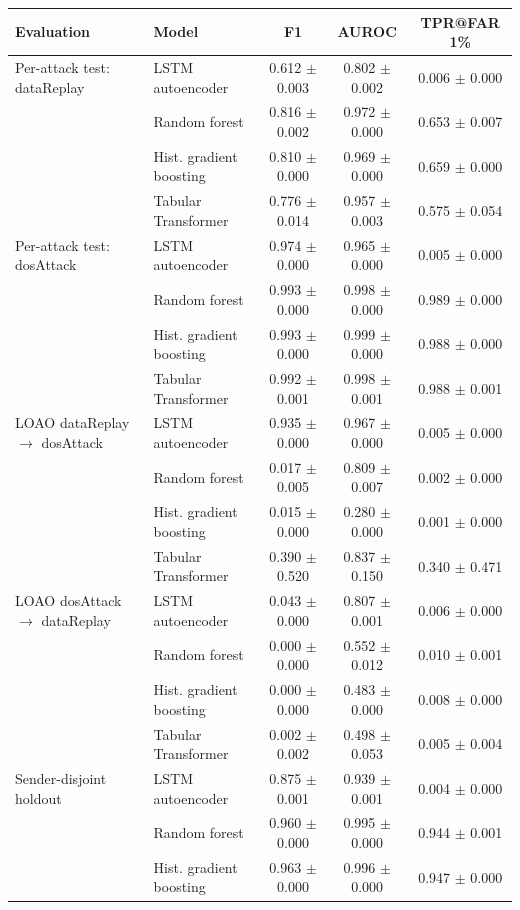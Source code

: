 \begin{tabular}{llccc}
\toprule
Evaluation & Model & F1 & AUROC & TPR@FAR 1\% \\
\midrule
Per-attack test: dataReplay & LSTM autoencoder & 0.612 $\pm$ 0.003 & 0.802 $\pm$ 0.002 & 0.006 $\pm$ 0.000 \\
 & Random forest & 0.816 $\pm$ 0.002 & 0.972 $\pm$ 0.000 & 0.653 $\pm$ 0.007 \\
 & Hist. gradient boosting & 0.810 $\pm$ 0.000 & 0.969 $\pm$ 0.000 & 0.659 $\pm$ 0.000 \\
 & Tabular Transformer & 0.776 $\pm$ 0.014 & 0.957 $\pm$ 0.003 & 0.575 $\pm$ 0.054 \\
\midrule
Per-attack test: dosAttack & LSTM autoencoder & 0.974 $\pm$ 0.000 & 0.965 $\pm$ 0.000 & 0.005 $\pm$ 0.000 \\
 & Random forest & 0.993 $\pm$ 0.000 & 0.998 $\pm$ 0.000 & 0.989 $\pm$ 0.000 \\
 & Hist. gradient boosting & 0.993 $\pm$ 0.000 & 0.999 $\pm$ 0.000 & 0.988 $\pm$ 0.000 \\
 & Tabular Transformer & 0.992 $\pm$ 0.001 & 0.998 $\pm$ 0.001 & 0.988 $\pm$ 0.001 \\
\midrule
LOAO dataReplay $\rightarrow$ dosAttack & LSTM autoencoder & 0.935 $\pm$ 0.000 & 0.967 $\pm$ 0.000 & 0.005 $\pm$ 0.000 \\
 & Random forest & 0.017 $\pm$ 0.005 & 0.809 $\pm$ 0.007 & 0.002 $\pm$ 0.000 \\
 & Hist. gradient boosting & 0.015 $\pm$ 0.000 & 0.280 $\pm$ 0.000 & 0.001 $\pm$ 0.000 \\
 & Tabular Transformer & 0.390 $\pm$ 0.520 & 0.837 $\pm$ 0.150 & 0.340 $\pm$ 0.471 \\
\midrule
LOAO dosAttack $\rightarrow$ dataReplay & LSTM autoencoder & 0.043 $\pm$ 0.000 & 0.807 $\pm$ 0.001 & 0.006 $\pm$ 0.000 \\
 & Random forest & 0.000 $\pm$ 0.000 & 0.552 $\pm$ 0.012 & 0.010 $\pm$ 0.001 \\
 & Hist. gradient boosting & 0.000 $\pm$ 0.000 & 0.483 $\pm$ 0.000 & 0.008 $\pm$ 0.000 \\
 & Tabular Transformer & 0.002 $\pm$ 0.002 & 0.498 $\pm$ 0.053 & 0.005 $\pm$ 0.004 \\
\midrule
Sender-disjoint holdout & LSTM autoencoder & 0.875 $\pm$ 0.001 & 0.939 $\pm$ 0.001 & 0.004 $\pm$ 0.000 \\
 & Random forest & 0.960 $\pm$ 0.000 & 0.995 $\pm$ 0.000 & 0.944 $\pm$ 0.001 \\
 & Hist. gradient boosting & 0.963 $\pm$ 0.000 & 0.996 $\pm$ 0.000 & 0.947 $\pm$ 0.000 \\

\end{tabular}
